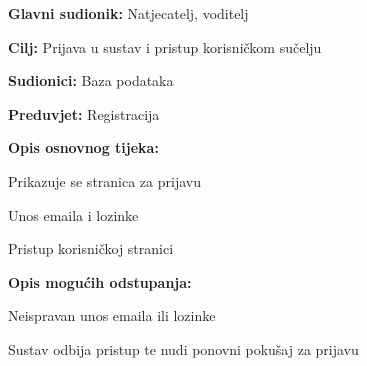 					\eject
					
					\noindent {}
					\begin{packed_item}
						
						\item \textbf{Glavni sudionik: }Natjecatelj, voditelj
						\item  \textbf{Cilj:} Prijava u sustav i pristup korisničkom sučelju 
						\item  \textbf{Sudionici:} Baza podataka
						\item  \textbf{Preduvjet:} Registracija
						\item  \textbf{Opis osnovnog tijeka:}
						
						\item[] \begin{packed_enum}
							
							\item Prikazuje se stranica za prijavu
							\item Unos emaila i lozinke
							\item Pristup korisničkoj stranici
							
						\end{packed_enum}
						
						\item  \textbf{Opis mogućih odstupanja:}
						
						\item[] \begin{packed_item}
							
							\item[2.a] Neispravan unos emaila ili lozinke
							\item[] \begin{packed_enum}
								
								\item Sustav odbija pristup te nudi ponovni pokušaj za prijavu
								
							\end{packed_enum}
						\end{packed_item}
					\end{packed_item}
					
